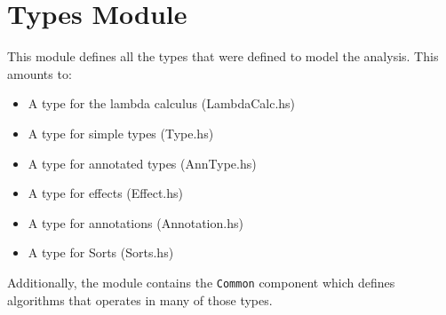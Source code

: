 \documentclass[8pt]{extarticle}
\begin{document}
\section{Types Module}
This module defines all the types that were defined to model the analysis. This amounts to:
\begin{itemize}
\item A type for the lambda calculus (LambdaCalc.hs)
\item A type for simple types (Type.hs)
\item A type for annotated types (AnnType.hs)
\item A type for effects (Effect.hs)
\item A type for annotations (Annotation.hs)
\item A type for Sorts (Sorts.hs)
\end{itemize}
Additionally, the module contains the \verb+Common+ component which defines algorithms that operates in many of those types.
\end{document}
